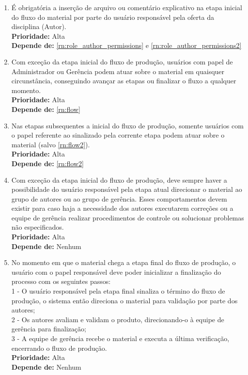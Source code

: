 \begin{enumerate}[label=\textbf{RN\protect\twodigits{\theenumi}}, leftmargin=2cm]
	\item \label{rn:flow} É obrigatória a inserção de arquivo ou comentário explicativo na etapa inicial do fluxo do material por parte do usuário responsável pela oferta da disciplina (Autor). \\
		\textbf{Prioridade:} Alta \\
		\textbf{Depende de:} \hyperref[rn:role_author_permissions]{\ref{rn:role_author_permissions}} e \hyperref[rn:role_author_permissions2]{\ref{rn:role_author_permissions2}}
				
	\item \label{rn:flow2} Com exceção da etapa inicial do fluxo de produção, usuários com papel de Administrador ou Gerência podem atuar sobre o material em quaisquer circunstância, conseguindo avançar as etapas ou finalizar o fluxo a qualquer momento. \\
		\textbf{Prioridade:} Alta \\
		\textbf{Depende de:} \hyperref[rn:flow]{\ref{rn:flow}}

	\item \label{rn:flow3} Nas etapas subsequentes a inicial do fluxo de produção, somente usuários com o papel referente ao sinalizado pela corrente etapa podem atuar sobre o material (salvo \hyperref[rn:flow2]{\ref{rn:flow2}}). \\
		\textbf{Prioridade:} Alta \\
		\textbf{Depende de:} \hyperref[rn:flow2]{\ref{rn:flow2}}

	\item \label{rn:flow4} Com exceção da etapa inicial do fluxo de produção, deve sempre haver a possibilidade do usuário responsável pela etapa atual direcionar o material ao grupo de autores ou ao grupo de gerência. Esses comportamentos devem existir para caso haja a necessidade dos autores executarem correções ou a equipe de gerência realizar procedimentos de controle ou solucionar problemas não especificados. \\
		\textbf{Prioridade:} Alta \\
		\textbf{Depende de:} Nenhum

	\item \label{rn:flow5} No momento em que o material chega a etapa final do fluxo de produção, o usuário com o papel responsável deve poder inicializar a finalização do processo com os seguintes passos: \\
		1 - O usuário responsável pela etapa final sinaliza o término do fluxo de produção, o sistema então direciona o material para validação por parte dos autores; \\
		2 - Os autores avaliam e validam o produto, direcionando-o à equipe de gerência para finalização; \\
		3 - A equipe de gerência recebe o material e executa a última verificação, encerrando o fluxo de produção. \\
		\textbf{Prioridade:} Alta \\
		\textbf{Depende de:} Nenhum

\end{enumerate}

